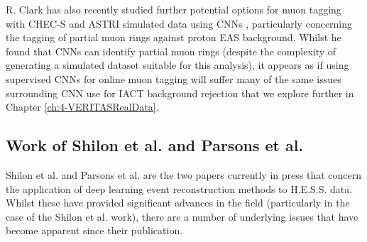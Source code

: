 R. Clark has also recently studied further potential options for muon tagging with CHEC-S and ASTRI simulated data using CNNs \cite{roganthesis}, particularly concerning the tagging of partial muon rings against proton EAS background. Whilst he found that CNNs can identify partial muon rings (despite the complexity of generating a simulated dataset suitable for this analysis), it appears as if using supervised CNNs for online muon tagging will suffer many of the same issues surrounding CNN use for IACT background rejection that we explore further in Chapter \ref{ch:4-VERITASRealData}.

\subsection{Work of Shilon et al. and Parsons et al.}
Shilon et al. \cite{Shilon} and Parsons et al. \cite{ParsonsOhm} are the two papers currently in press that concern the application of deep learning event reconstruction methods to H.E.S.S. data. Whilst these have provided significant advances in the field (particularly in the case of the Shilon et al. work), there are a number of underlying issues that have become apparent since their publication.

